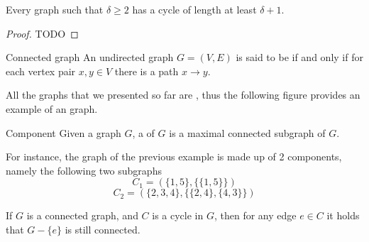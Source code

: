 \documentclass[a4paper, 12pt]{report}
\begin{document}
    \begin{framedprop}[label={min deg 2}]{}
        Every graph such that $\delta \ge 2$ has a cycle of length at least $\delta + 1$.
    \end{framedprop}

    \begin{proof}
        TODO 
    \end{proof}

    \begin{frameddefn}{Connected graph}
        An undirected graph $G = (V, E)$ is said to be  if and only if for each vertex pair $x, y \in V$ there is a path $x \to y$.
    \end{frameddefn}

    All the graphs that we presented so far are , thus the following figure provides an example of an  graph.

    \begin{figure}[H]
        \centering
    \end{figure}

    \begin{frameddefn}{Component}
        Given a graph $G$, a  of $G$ is a maximal connected subgraph of $G$.
    \end{frameddefn}

    For instance, the graph of the previous example is made up of 2 components, namely the following two subgraphs $$C_1 = (\{1, 5\}, \{\{1, 5\}\})$$ $$C_2 = (\{2, 3, 4\}, \{\{2, 4\}, \{4, 3\}\})$$

    \begin{framedprop}[label={avoid cycle}]{}
        If $G$ is a connected graph, and $C$ is a cycle in $G$, then for any edge $e \in C$ it holds that $G - \{e\}$ is still connected.
    \end{framedprop}
\end{document}
